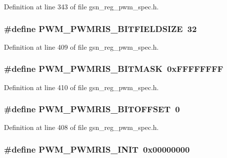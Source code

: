 Definition at line 343 of file gsn\_\-reg\_\-pwm\_\-spec.h.

\hypertarget{a00565_a58f5287ba2f123a06d724a22fb9b85f5}{
\subsubsection[{PWM\_\-PWMRIS\_\-BITFIELDSIZE}]{\setlength{\rightskip}{0pt plus 5cm}\#define PWM\_\-PWMRIS\_\-BITFIELDSIZE~32}}
\label{a00565_a58f5287ba2f123a06d724a22fb9b85f5}


Definition at line 409 of file gsn\_\-reg\_\-pwm\_\-spec.h.

\hypertarget{a00565_a4dec8740cf398f2550ef3685cfbf13e9}{
\subsubsection[{PWM\_\-PWMRIS\_\-BITMASK}]{\setlength{\rightskip}{0pt plus 5cm}\#define PWM\_\-PWMRIS\_\-BITMASK~0xFFFFFFFF}}
\label{a00565_a4dec8740cf398f2550ef3685cfbf13e9}


Definition at line 410 of file gsn\_\-reg\_\-pwm\_\-spec.h.

\hypertarget{a00565_acaff455b91b6368bbe26d2843c5269da}{
\subsubsection[{PWM\_\-PWMRIS\_\-BITOFFSET}]{\setlength{\rightskip}{0pt plus 5cm}\#define PWM\_\-PWMRIS\_\-BITOFFSET~0}}
\label{a00565_acaff455b91b6368bbe26d2843c5269da}


Definition at line 408 of file gsn\_\-reg\_\-pwm\_\-spec.h.

\hypertarget{a00565_a839e8d008fe8c5db26fb49cb48f4595f}{
\subsubsection[{PWM\_\-PWMRIS\_\-INIT}]{\setlength{\rightskip}{0pt plus 5cm}\#define PWM\_\-PWMRIS\_\-INIT~0x00000000}}
\label{a00565_a839e8d008fe8c5db26fb49cb48f4595f}


